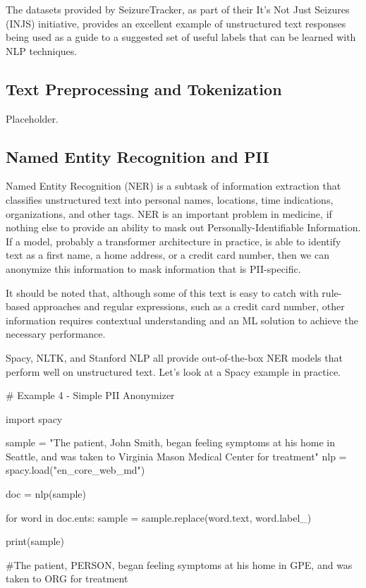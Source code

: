 The datasets provided by SeizureTracker, as part of their It's Not Just Seizures (INJS) initiative, provides an excellent example of unstructured text responses being
used as a guide to a suggested set of useful labels that can be learned with NLP techniques.
\subsection{Text Preprocessing and Tokenization}

Placeholder.

\subsection{Named Entity Recognition and PII}

Named Entity Recognition (NER) is a subtask of information extraction that classifies unstructured text into personal names, locations, time indications, organizations, and other tags.
NER is an important problem in medicine, if nothing else to provide an ability to mask out Personally-Identifiable Information.
If a model, probably a transformer architecture in practice, is able to identify text as a first name, a home address, or a credit card number, then we can anonymize this information to mask information that is PII-specific.

It should be noted that, although some of this text is easy to catch with rule-based approaches and regular expressions, such as a credit card number, other information requires contextual understanding and an ML solution
to achieve the necessary performance.

Spacy, NLTK, and Stanford NLP all provide out-of-the-box NER models that perform well on unstructured text. Let's look at a Spacy example in practice.

\begin{python}
  # Example 4 - Simple PII Anonymizer

  import spacy

  sample = "The patient, John Smith, began feeling symptoms at his home in Seattle, and was taken to Virginia Mason Medical Center for treatment"
  nlp = spacy.load("en_core_web_md")

  doc = nlp(sample)

  for word in doc.ents:
      sample = sample.replace(word.text, word.label_)

  print(sample)

  #The patient, PERSON, began feeling symptoms at his home in GPE, and was taken to ORG for treatment

\end{python}

